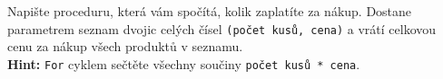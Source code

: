 \question[50]
Napište proceduru, která vám spočítá, kolik zaplatíte za nákup. Dostane
parametrem seznam dvojic celých čísel \texttt{(počet kusů, cena)} a vrátí
celkovou cenu za
nákup všech produktů v seznamu.\\
\textbf{Hint:} \texttt{For} cyklem sečtěte všechny součiny \texttt{počet kusů * cena}.